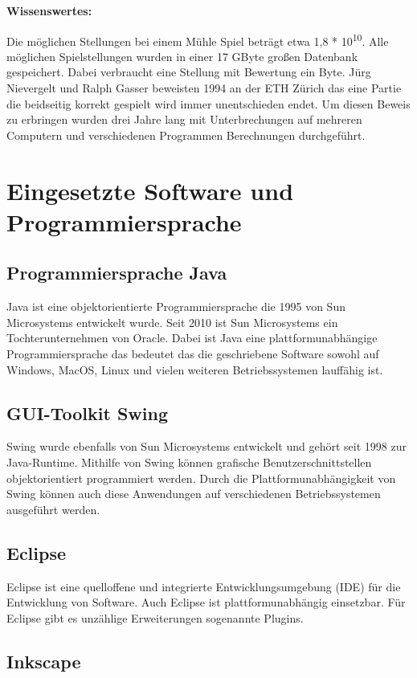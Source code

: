 \documentclass[oneside]{ausarbeitung}
\begin{document}
\textbf{Wissenswertes:}

Die möglichen Stellungen bei einem Mühle Spiel beträgt etwa 1,8 * 10\textsuperscript{10}. Alle möglichen Spielstellungen wurden in einer 17 GByte großen Datenbank gespeichert. Dabei verbraucht eine Stellung mit Bewertung ein Byte. Jürg Nievergelt und Ralph Gasser beweisten 1994 an der ETH Zürich das eine Partie die beidseitig korrekt gespielt wird immer unentschieden endet. Um diesen Beweis zu erbringen wurden drei Jahre lang mit Unterbrechungen auf mehreren Computern und verschiedenen Programmen Berechnungen durchgeführt.

\section{Eingesetzte Software und Programmiersprache}

\subsection{Programmiersprache Java}

Java ist eine objektorientierte Programmiersprache die 1995 von Sun Microsystems entwickelt wurde. Seit 2010 ist Sun Microsystems ein Tochterunternehmen von Oracle. Dabei ist Java eine plattformunabhängige Programmiersprache das bedeutet das die geschriebene Software sowohl auf Windows, MacOS, Linux und vielen weiteren Betriebssystemen lauffähig ist.

\subsection{GUI-Toolkit Swing}

Swing wurde ebenfalls von Sun Microsystems entwickelt und gehört seit 1998 zur Java-Runtime. Mithilfe von Swing können grafische Benutzerschnittstellen objektorientiert programmiert werden. Durch die Plattformunabhängigkeit von Swing können auch diese Anwendungen auf verschiedenen Betriebssystemen ausgeführt werden.

\subsection{Eclipse}

Eclipse ist eine quelloffene und integrierte Entwicklungsumgebung (IDE) für die Entwicklung von Software. Auch Eclipse ist plattformunabhängig einsetzbar. Für Eclipse gibt es unzählige Erweiterungen sogenannte Plugins.

\subsection{Inkscape}
\end{document}
